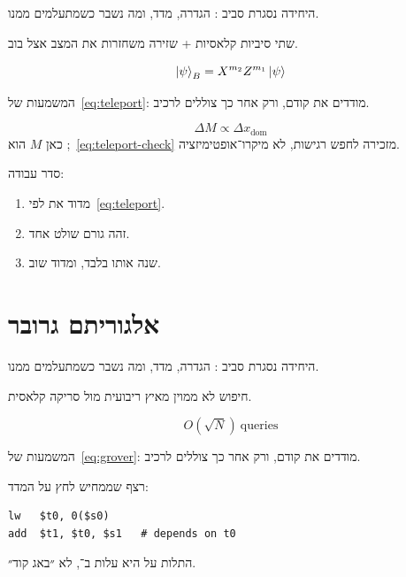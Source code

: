היחידה נסגרת סביב : הגדרה, מדד, ומה נשבר כשמתעלמים ממנו.

\begin{keybox}[frametitle={רעיון מפתח — טלפורטציה}]
שתי סיביות קלאסיות + שזירה משחזרות את המצב אצל בוב.
\end{keybox}

\begin{equation}
\label{eq:teleport}
\left|\psi\right\rangle_B = X^{m_2}Z^{m_1}\left|\psi\right\rangle
\end{equation}

המשמעות של~\eqref{eq:teleport}: מודדים את  קודם, ורק אחר כך צוללים לרכיב.

\begin{equation}
\label{eq:teleport-check}
\Delta M \propto \Delta x_{\mathrm{dom}}
\end{equation}
כאן $M$ הוא ;~\eqref{eq:teleport-check} מזכירה לחפש רגישות, לא מיקרו־אופטימיזציה.

סדר עבודה:
\begin{enumerate}
\item[(\textbf{א})] מדוד את  לפי~\eqref{eq:teleport}.
\item[(\textbf{ב})] זהה גורם שולט אחד.
\item[(\textbf{ג})] שנה אותו בלבד, ומדוד שוב.
\end{enumerate}

\chapter{אלגוריתם גרובר}
\label{ch:grover}

היחידה נסגרת סביב : הגדרה, מדד, ומה נשבר כשמתעלמים ממנו.

\begin{defbox}[frametitle={הגדרה — אלגוריתם גרובר}]
חיפוש לא ממוין מאיץ ריבועית מול סריקה קלאסית.
\end{defbox}

\begin{equation}
\label{eq:grover}
O(\sqrt N)\ \mathrm{queries}
\end{equation}

המשמעות של~\eqref{eq:grover}: מודדים את  קודם, ורק אחר כך צוללים לרכיב.

רצף שממחיש לחץ על המדד:
\begin{asmblock}
\begin{lstlisting}[style=asm]
lw   $t0, 0($s0)
add  $t1, $t0, $s1   # depends on t0
\end{lstlisting}
\end{asmblock}
התלות על  היא עלות ב־, לא ״באג קוד״.

